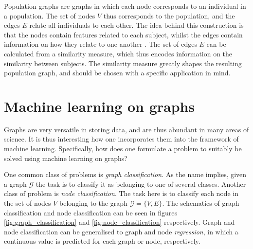 Population graphs are graphs in which each node corresponds to an individual in a population. The set of nodes $V$ thus corresponds to the population, and the edges $E$ relate all individuals to each other. The idea behind this construction is that the nodes contain features related to each subject, whilst the edges contain information on how they relate to one another \cite{stankeviciute}. The set of edges $E$ can be calculated from a similarity measure, which thus encodes information on the similarity between subjects. The similarity measure greatly shapes the resulting population graph, and should be chosen with a specific application in mind. 

\section{Machine learning on graphs}

Graphs are very versatile in storing data, and are thus abundant in many areas of science. It is thus interesting how one incorporates them into the framework of machine learning. Specifically, how does one formulate a problem to suitably be solved using machine learning on graphs? 

One common class of problems is \textit{graph classification}. As the name implies, given a graph $\mathcal{G}$ the task is to classify it as belonging to one of several classes. Another class of problem is \textit{node classification}. The task here is to classify each node in the set of nodes $V$ belonging to the graph $\mathcal{G} = \{V, E \}$. The schematics of graph classification and node classification can be seen in figures \ref{fig:graph_classification} and \ref{fig:node_classification} respectively. Graph and node classification can be generalised to graph and node \textit{regression}, in which a continuous value is predicted for each graph or node, respectively.




